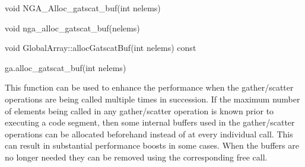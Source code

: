\documentclass[12pt]{article}
\begin{document}
\begin{capi}
\begin{ccode}
void NGA_Alloc_gatscat_buf(int nelems)
\end{ccode}
\begin{funcargs}
\end{funcargs}
\end{capi}

\begin{fapi}
\begin{fcode}
void nga_alloc_gatscat_buf(nelems)
\end{fcode}
\begin{funcargs}
\end{funcargs}
\end{fapi}

\begin{cxxapi}
\begin{cxxcode}
void GlobalArray::allocGatscatBuf(int nelems) const
\end{cxxcode}
\begin{funcargs}
\end{funcargs}
\end{cxxapi}

\begin{pyapi}
\begin{pycode}
ga.alloc_gatscat_buf(int nelems)
\end{pycode}
\begin{funcargs}
\end{funcargs}
\end{pyapi}

\local

\begin{desc}
This function can be used to enhance the performance when the gather/scatter
operations are being called multiple times in succession. If the maximum number
of elements being called in any gather/scatter operation is known prior to
executing a code segment, then some internal buffers used in the gather/scatter
operations can be allocated beforehand instead of at every individual call. This
can result in substantial performance boosts in some cases. When the buffers are
no longer needed they can be removed using the corresponding free call.
\end{desc}
\end{document}
